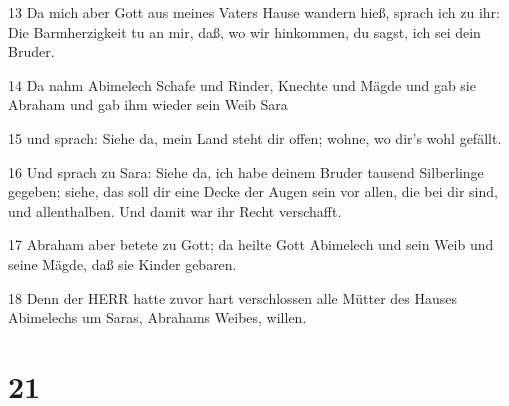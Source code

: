 \par 13 Da mich aber Gott aus meines Vaters Hause wandern hieß, sprach ich zu ihr: Die Barmherzigkeit tu an mir, daß, wo wir hinkommen, du sagst, ich sei dein Bruder.
\par 14 Da nahm Abimelech Schafe und Rinder, Knechte und Mägde und gab sie Abraham und gab ihm wieder sein Weib Sara
\par 15 und sprach: Siehe da, mein Land steht dir offen; wohne, wo dir's wohl gefällt.
\par 16 Und sprach zu Sara: Siehe da, ich habe deinem Bruder tausend Silberlinge gegeben; siehe, das soll dir eine Decke der Augen sein vor allen, die bei dir sind, und allenthalben. Und damit war ihr Recht verschafft.
\par 17 Abraham aber betete zu Gott; da heilte Gott Abimelech und sein Weib und seine Mägde, daß sie Kinder gebaren.
\par 18 Denn der HERR hatte zuvor hart verschlossen alle Mütter des Hauses Abimelechs um Saras, Abrahams Weibes, willen.

\chapter{21}

